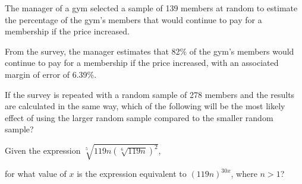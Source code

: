 \vspace{0.75em}


\vspace{2em}
\newpage

\noindent\markforreview
\vspace{1em}

The manager of a gym selected a sample of 139 members at random to estimate the percentage of the gym's members that would continue to pay for a membership if the price increased.

From the survey, the manager estimates that 82\% of the gym's members would continue to pay for a membership if the price increased, with an associated margin of error of 6.39\%.

If the survey is repeated with a random sample of 278 members and the results are calculated in the same way, which of the following will be the most likely effect of using the larger random sample compared to the smaller random sample?

\vspace{0.75em}


\vspace{2em}
\newpage

\noindent\markforreview
\vspace{1em}

Given the expression \(\sqrt[5]{119n \left(\sqrt[6]{119n}\right)^2}\),

for what value of \(x\) is the expression equivalent to \((119n)^{30x}\), where \(n > 1\)?

\vspace{0.75em}


\vspace{2em}
\newpage

\noindent\markforreview
\vspace{1em}

